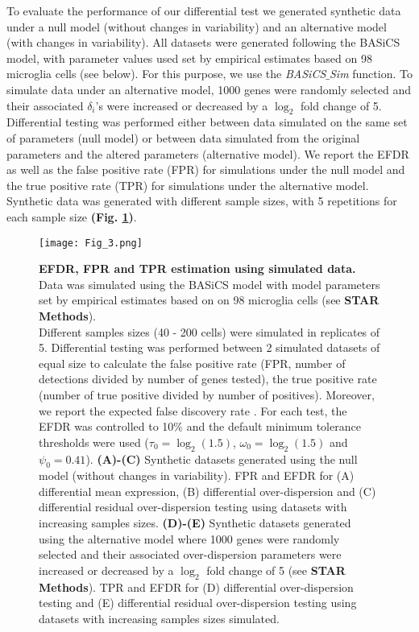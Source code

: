 To evaluate the performance of our differential test we generated synthetic data under a null model (without changes in variability) and an alternative model (with changes in variability). All datasets were generated following the BASiCS model, with parameter values used set by empirical estimates based on 98 microglia cells (see below). For this purpose, we use the \emph{BASiCS$\_$Sim} function. To simulate data under an alternative model, 1000 genes were randomly selected and their associated $\delta_i$'s were increased or decreased by a $\log_2$ fold change of 5. Differential testing was performed either between data simulated on the same set of parameters (null model) or between data simulated from the original parameters and the altered parameters (alternative model). We report the EFDR \citep{Newton2004} as well as the false positive rate (FPR) for simulations under the null model and the true positive rate (TPR) for simulations under the alternative model. Synthetic data was generated with different sample sizes, with 5 repetitions for each sample size \textbf{(Fig. \ref{fig2:EFDR})}.

\newpage

\begin{figure}[!h]
\centering
\texttt{[image: Fig\_3.png]}
\caption[EFDR, FPR and TPR estimation using simulated data.]{\textbf{EFDR, FPR and TPR estimation using simulated data.}\\
Data was simulated using the BASiCS model with model parameters set by empirical estimates based on on 98 microglia cells (see \textbf{STAR Methods}).  \\
Different samples sizes (40 - 200 cells) were simulated in replicates of 5. Differential testing was performed between 2 simulated datasets of equal size to calculate the false positive rate (FPR, number of detections divided by number of genes tested), the true positive rate (number of true positive divided by number of positives). Moreover, we report the expected false discovery rate \citep[EFDR,][]{Newton2004}. 
For each test, the EFDR was controlled to 10\% and the default minimum tolerance thresholds were used ($\tau_0 = \log_2(1.5)$, $\omega_0 = \log_2(1.5)$ and $\psi_0 = 0.41$). \textbf{(A)-(C)} Synthetic datasets generated using the null model (without changes in variability). FPR and EFDR for (A) differential mean expression, (B) differential over-dispersion and (C) differential residual over-dispersion testing using datasets with increasing samples sizes. \textbf{(D)-(E)} Synthetic datasets generated using the alternative model where 1000 genes were randomly selected and their associated over-dispersion parameters were increased or decreased by a $\log_2$ fold change of 5 (see \textbf{STAR Methods}). TPR and EFDR for (D) differential over-dispersion testing and (E) differential residual over-dispersion testing using datasets with increasing samples sizes simulated.\\
}\label{fig2:EFDR}
\end{figure}

